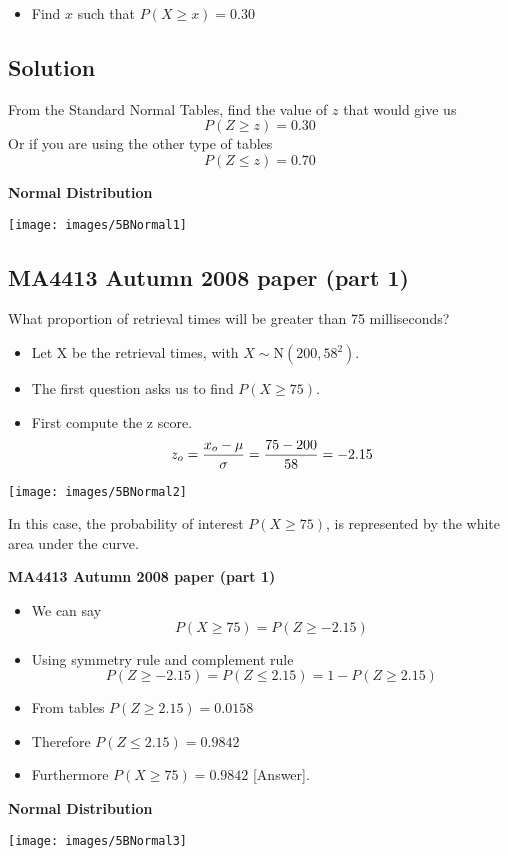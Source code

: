 \begin{itemize}
	\item Find $x$ such that $P(X \geq x) = 0.30$
\end{itemize}



\subsection*{Solution}

From the Standard Normal Tables, find the value of $z$ that would give us
\[ P(Z \geq z) = 0.30 \]
Or if you are using the other type of tables 
\[ P(Z \leq z) = 0.70  \]


\noindent \textbf{Normal Distribution}

\begin{center}
	\texttt{[image: images/5BNormal1]}
\end{center}




\subsection{MA4413 Autumn 2008 paper (part 1)}
What proportion of retrieval times will be greater than 75 milliseconds?\\ \bigskip

\begin{itemize}
	\item Let X be the retrieval times, with $X \sim \mbox{N}(200,58^2)$.\\
	\item The first question asks us to find $P( X \geq 75)$. \\
	\item First compute the z score.
	\[ z_o =  {x_o - \mu \over \sigma} = {75 - 200 \over 58}  = -2.15 \]
\end{itemize}



\begin{center}
	\texttt{[image: images/5BNormal2]}
\end{center}

In this case, the probability of interest $P(X\geq 75)$, is represented by the white area under the curve.


{
	\noindent \textbf{MA4413 Autumn 2008 paper (part 1)}
	\begin{itemize}
		\item We can say
		\[ P( X \geq 75) = P( Z \geq -2.15)\]
		\item Using symmetry rule and complement rule
		\[ P( Z \geq -2.15) = P( Z \leq 2.15) = 1- P( Z \geq 2.15)\]
		\item From tables $P( Z \geq 2.15) = 0.0158$
		\item Therefore $P( Z \leq 2.15) = 0.9842$
		\item Furthermore $P( X \geq 75) = \boldsymbol{0.9842}$ [Answer].
	\end{itemize}
}

\noindent \textbf{Normal Distribution}

\begin{center}
	\texttt{[image: images/5BNormal3]}
\end{center}
